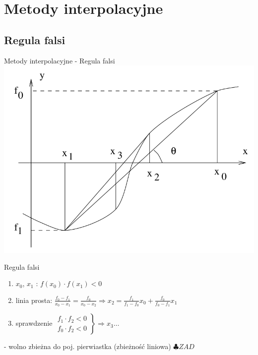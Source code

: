 \section{Metody interpolacyjne}
\subsection{Regula falsi}
\begin{frame}{Metody interpolacyjne - Regula falsi}
	\centering   \includegraphics[width=.7\linewidth]{img/7/7_6_1}
\end{frame}
\begin{frame}{Regula falsi}
	\begin{enumerate}
		\item $x_{0}$, $x_{1}$ : $f(x_{0}) \cdot f(x_{1}) < 0$
		
		\item linia prosta: $\frac{f_{0} - f_{1}}{x_{0} - x_{1}} = \frac{f_{0}}{x_{0} - x_{2}} \Rightarrow x_{2} = \frac{f_{1}}{f_{1} - f_{0}} x_{0} + \frac{f_{0}}{f_{0} - f_{1}}x_{1}$
		
		\item sprawdzenie 	$\left. \begin{array}{ll}
								f_{1} \cdot f_{2} < 0\\
								f_{0} \cdot f_{2} < 0
							\end{array}\right\} \Rightarrow x_{3} \ldots$\\
	\end{enumerate}
	- wolno zbieżna do poj. pierwiastka (zbieżność liniowa) \quad $\clubsuit ZAD$
\end{frame}
